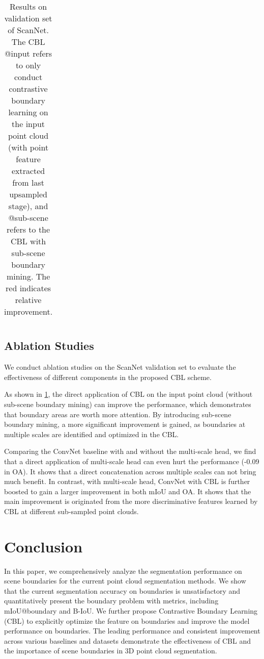 \documentclass[10pt,twocolumn,letterpaper]{article}
\begin{document}
\begin{table}
\begin{center}
{\begin{tabular}{c|cc|l|l}
\end{tabular}
}\end{center}
\caption{Results on validation set of ScanNet\cite{scannet}. The CBL @input refers to only conduct contrastive boundary learning on the input point cloud (with point feature extracted from last upsampled stage), and @sub-scene refers to the CBL with sub-scene boundary mining. The {\color{red}red} indicates relative improvement.}
\label{tbl:ablation}
\end{table}

\subsection{Ablation Studies}
\label{sec:ablation}
We conduct ablation studies on the ScanNet validation set to evaluate the effectiveness of different components in the proposed CBL scheme.

 As shown in \cref{tbl:ablation}, the direct application of CBL on the input point cloud (without sub-scene boundary mining) can improve the performance, which demonstrates that boundary areas are worth more attention. By introducing sub-scene boundary mining, a more significant improvement is gained, as boundaries at multiple scales are identified and optimized in the CBL.

Comparing the ConvNet baseline with and without the multi-scale head, we find that a direct application of multi-scale head can even hurt the performance (-0.09 in OA). It shows that a direct concatenation across multiple scales can not bring much benefit. In contrast, with multi-scale head, ConvNet with CBL is further boosted to gain a larger improvement in both mIoU and OA. It shows that the main improvement is originated from the more discriminative features learned by CBL at different sub-sampled point clouds.

\section{Conclusion}
In this paper, we comprehensively analyze the segmentation performance on scene boundaries for the current point cloud segmentation methods. We show that the current segmentation accuracy on boundaries is unsatisfactory and quantitatively present the boundary problem with metrics, including mIoU@boundary and B-IoU. We further propose Contrastive Boundary Learning (CBL) to explicitly optimize the feature on boundaries and improve the model performance on boundaries. The leading performance and consistent improvement across various baselines and datasets demonstrate the effectiveness of CBL and the importance of scene boundaries in 3D point cloud segmentation.
\end{document}
